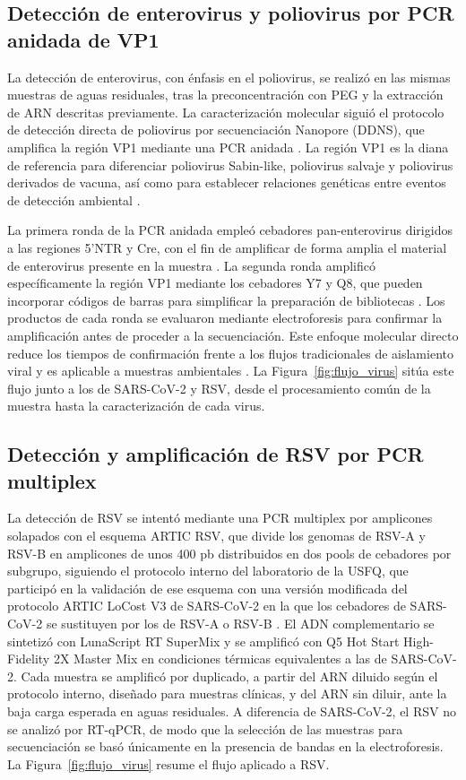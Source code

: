 \subsection{Detección de enterovirus y poliovirus por PCR anidada de VP1}

La detección de enterovirus, con énfasis en el poliovirus, se realizó en las mismas muestras de aguas residuales, tras la preconcentración con PEG y la extracción de ARN descritas previamente. La caracterización molecular siguió el protocolo de detección directa de poliovirus por secuenciación Nanopore (DDNS), que amplifica la región VP1 mediante una PCR anidada \cite{Shaw_2020,Shaw_2022_protocol}. La región VP1 es la diana de referencia para diferenciar poliovirus Sabin-like, poliovirus salvaje y poliovirus derivados de vacuna, así como para establecer relaciones genéticas entre eventos de detección ambiental \cite{Asghar_2014,Zurbriggen_2008}.

La primera ronda de la PCR anidada empleó cebadores pan-enterovirus dirigidos a las regiones 5'NTR y Cre, con el fin de amplificar de forma amplia el material de enterovirus presente en la muestra \cite{Arita_2015}. La segunda ronda amplificó específicamente la región VP1 mediante los cebadores Y7 \cite{Kilpatrick_2011} y Q8, que pueden incorporar códigos de barras para simplificar la preparación de bibliotecas \cite{Shaw_2020,Shaw_2022_protocol}. Los productos de cada ronda se evaluaron mediante electroforesis para confirmar la amplificación antes de proceder a la secuenciación. Este enfoque molecular directo reduce los tiempos de confirmación frente a los flujos tradicionales de aislamiento viral y es aplicable a muestras ambientales \cite{Shaw_2022}. La Figura~\ref{fig:flujo_virus} sitúa este flujo junto a los de SARS-CoV-2 y RSV, desde el procesamiento común de la muestra hasta la caracterización de cada virus.

\subsection{Detección y amplificación de RSV por PCR multiplex}

La detección de RSV se intentó mediante una PCR multiplex por amplicones solapados con el esquema ARTIC RSV, que divide los genomas de RSV-A y RSV-B en amplicones de unos 400 pb distribuidos en dos pools de cebadores por subgrupo, siguiendo el protocolo interno del laboratorio de la USFQ, que participó en la validación de ese esquema con una versión modificada del protocolo ARTIC LoCost V3 de SARS-CoV-2 en la que los cebadores de SARS-CoV-2 se sustituyen por los de RSV-A o RSV-B \cite{Maloney_2025}. El ADN complementario se sintetizó con LunaScript RT SuperMix y se amplificó con Q5 Hot Start High-Fidelity 2X Master Mix en condiciones térmicas equivalentes a las de SARS-CoV-2. Cada muestra se amplificó por duplicado, a partir del ARN diluido según el protocolo interno, diseñado para muestras clínicas, y del ARN sin diluir, ante la baja carga esperada en aguas residuales. A diferencia de SARS-CoV-2, el RSV no se analizó por RT-qPCR, de modo que la selección de las muestras para secuenciación se basó únicamente en la presencia de bandas en la electroforesis. La Figura~\ref{fig:flujo_virus} resume el flujo aplicado a RSV.

